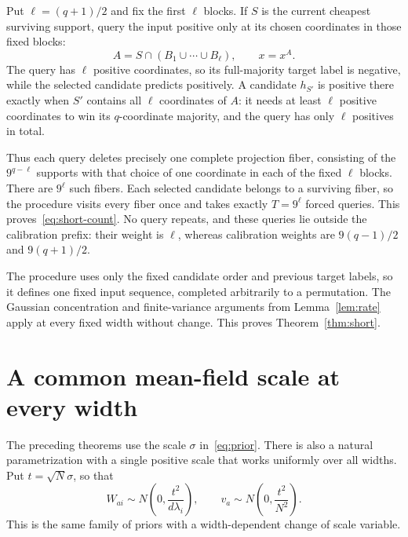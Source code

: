 \documentclass[11pt]{article}
\begin{document}
Put $\ell=(q+1)/2$ and fix the first $\ell$ blocks. If $S$ is
the current cheapest surviving support, query the input positive only
at its chosen coordinates in those fixed blocks:
\[
 A=S\cap(B_1\cup\cdots\cup B_\ell),\qquad x=x^A.
\]
The query has $\ell$ positive coordinates, so its full-majority target
label is negative, while the selected candidate predicts positively.
A candidate $h_{S'}$ is positive there exactly when $S'$ contains
all $\ell$ coordinates of $A$: it needs at least $\ell$ positive
coordinates to win its $q$-coordinate majority, and the query has
only $\ell$ positives in total.

Thus each query deletes precisely one complete projection fiber,
consisting of the $9^{q-\ell}$ supports with that choice of one
coordinate in each of the fixed $\ell$ blocks. There are $9^\ell$
such fibers. Each selected candidate belongs to a surviving fiber,
so the procedure visits every fiber once and takes exactly
$T=9^\ell$ forced queries. This proves~\eqref{eq:short-count}.
No query repeats, and these queries lie outside the calibration
prefix: their weight is $\ell$, whereas calibration weights are
$9(q-1)/2$ and $9(q+1)/2$.

The procedure uses only the fixed candidate order and previous target
labels, so it defines one fixed input sequence, completed arbitrarily
to a permutation. The Gaussian concentration and finite-variance
arguments from Lemma~\ref{lem:rate} apply at every fixed width without
change. This proves Theorem~\ref{thm:short}.

\section{A common mean-field scale at every width}

The preceding theorems use the scale $\sigma$ in~\eqref{eq:prior}.
There is also a natural parametrization with a single positive scale
that works uniformly over all widths. Put $t=\sqrt N\sigma$, so that
\begin{equation}\label{eq:meanfield-prior}
 W_{ai}\sim N\!\left(0,\frac{t^2}{d\lambda_i}\right),\qquad
 v_a\sim N\!\left(0,\frac{t^2}{N^2}\right).
\end{equation}
This is the same family of priors with a width-dependent change of
scale variable.
\end{document}
